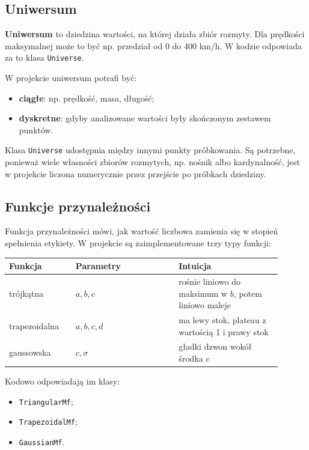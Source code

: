 \documentclass[11pt,a4paper]{article}
\newcommand{\code}[1]{\texttt{#1}}
\newcommand{\term}[1]{\textbf{#1}}
\begin{document}
\subsection{Uniwersum}

\term{Uniwersum} to dziedzina wartości, na której działa zbiór rozmyty. Dla prędkości maksymalnej może to być np. przedział od 0 do 400 km/h. W kodzie odpowiada za to klasa \code{Universe}.

W projekcie uniwersum potrafi być:

\begin{itemize}
    \item \term{ciągłe}: np. prędkość, masa, długość;
    \item \term{dyskretne}: gdyby analizowane wartości były skończonym zestawem punktów.
\end{itemize}

Klasa \code{Universe} udostępnia między innymi punkty próbkowania. Są potrzebne, ponieważ wiele własności zbiorów rozmytych, np. nośnik albo kardynalność, jest w projekcie liczona numerycznie przez przejście po próbkach dziedziny.

\subsection{Funkcje przynależności}

Funkcja przynależności mówi, jak wartość liczbowa zamienia się w stopień spełnienia etykiety. W projekcie są zaimplementowane trzy typy funkcji:

\begin{longtable}{p{0.22\linewidth}p{0.34\linewidth}p{0.34\linewidth}}
\toprule
\textbf{Funkcja} & \textbf{Parametry} & \textbf{Intuicja}\\
\midrule
\endhead
trójkątna & \(a,b,c\) & rośnie liniowo do maksimum w \(b\), potem liniowo maleje\\
trapezoidalna & \(a,b,c,d\) & ma lewy stok, plateau z wartością 1 i prawy stok\\
gaussowska & \(c,\sigma\) & gładki dzwon wokół środka \(c\)\\
\bottomrule
\end{longtable}

Kodowo odpowiadają im klasy:

\begin{itemize}
    \item \code{TriangularMf};
    \item \code{TrapezoidalMf};
    \item \code{GaussianMf}.
\end{itemize}
\end{document}
